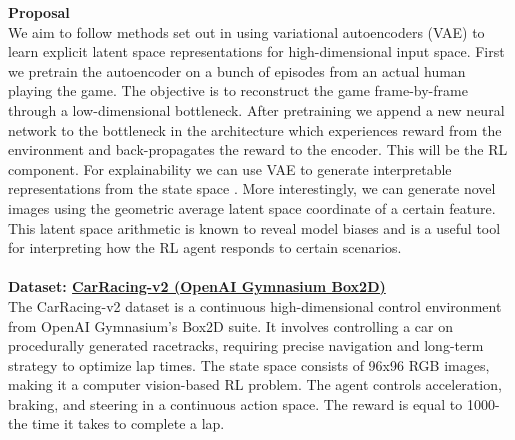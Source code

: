 \documentclass[12pt]{article}
\begin{document}
\noindent \textbf{Proposal}\\
We aim to follow methods set out in \cite{gebauer_pitfall_2021} using variational autoencoders (VAE) to learn explicit latent space representations for high-dimensional input space.
First we pretrain the autoencoder on a bunch of episodes from an actual human playing the game.
The objective is to reconstruct the game frame-by-frame through a low-dimensional bottleneck. 
After pretraining we append a new neural network to the bottleneck in the architecture which experiences reward from the environment and back-propagates the reward to the encoder.
This will be the RL component.
For explainability we can use VAE to generate interpretable representations from the state space \cite{white_sampling_2016}.
More interestingly, we can generate novel images using the geometric average latent space coordinate of a certain feature. 
This latent space arithmetic is known to reveal model biases and is a useful tool for interpreting how the RL agent responds to certain scenarios.
\\\\
\noindent \textbf{Dataset: \href{https://gymnasium.farama.org/environments/box2d/car_racing/}{CarRacing-v2 (OpenAI Gymnasium Box2D)}}\\
The CarRacing-v2 dataset is a continuous high-dimensional control environment from OpenAI Gymnasium’s Box2D suite. It involves controlling a car on procedurally generated racetracks, requiring precise navigation and long-term strategy to optimize lap times. The state space consists of 96x96 RGB images, making it a computer vision-based RL problem. The agent controls acceleration, braking, and steering in a continuous action space. The reward is equal to 1000-the time it takes to complete a lap.

\printbibliography
\end{document}
